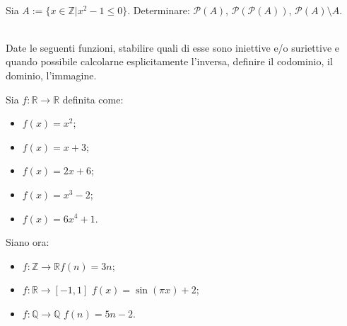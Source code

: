 \documentclass{article}
\begin{document}
\vspace{0,2cm}
\\
Sia $A :=\{x\in \mathbb{Z}| x^2-1\leq 0\}$. Determinare:
$\mathcal{P} (A)$, $\mathcal{P}(\mathcal{P}(A))$, $\mathcal{P}(A) \setminus A$.

\vspace{0,2cm}
\\
Date le seguenti funzioni, stabilire quali di esse sono iniettive e/o suriettive e quando possibile calcolarne esplicitamente l'inversa, definire il codominio, il dominio, l'immagine.

Sia $f: \mathbb{R} \rightarrow \mathbb{R}$ definita come:
\begin{itemize}
	\item $f(x)=x^2$;
	\item $f(x)=x+3$;
	\item $f(x)=2x+6$;
	\item $f(x)=x^3-2$;
	\item $f(x)=6x^4+1$. 
\end{itemize}

Siano ora:
\begin{itemize}
	\item $f: \mathbb{Z} \rightarrow \mathbb{R} $\qquad $f(n)=3n$;
	\item $f: \mathbb{R} \rightarrow [-1,1]$ \qquad $f(x)= \sin(\pi x) +2$;
	\item $f: \mathbb{Q} \rightarrow \mathbb{Q}$ \qquad $f(n)=5n-2$.

\end{itemize}
\end{document}

